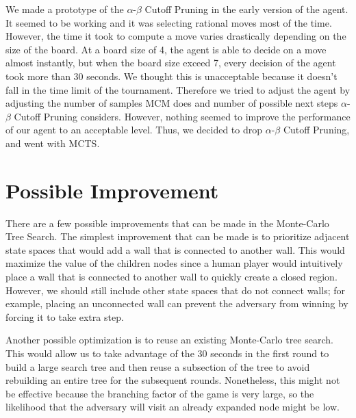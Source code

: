 \documentclass[twoside,11pt]{article}
\begin{document}
We made a prototype of the \(\alpha\)-\(\beta\) Cutoff Pruning in the early version of the agent. 
It seemed to be working and it was selecting rational moves most of the time. 
However, the time it took to compute a move varies drastically depending on the size of the board. 
At a board size of 4, the agent is able to decide on a move almost instantly, but when the board size exceed 7, every decision of the agent took more than 30 seconds.
We thought this is unacceptable because it doesn't fall in the time limit of the tournament.
Therefore we tried to adjust the agent by adjusting the number of samples MCM does and number of possible next steps \(\alpha\)-\(\beta\) Cutoff Pruning considers.
However, nothing seemed to improve the performance of our agent to an acceptable level.
Thus, we decided to drop \(\alpha\)-\(\beta\) Cutoff Pruning, and went with MCTS.

\section{Possible Improvement}

There are a few possible improvements that can be made in the Monte-Carlo Tree Search.
The simplest improvement that can be made is to prioritize adjacent state spaces that would add a wall that is connected to another wall.
This would maximize the value of the children nodes since a human player would intuitively place a wall that is connected to another wall to quickly create a closed region.
However, we should still include other state spaces that do not connect walls;
for example, placing an unconnected wall can prevent the adversary from winning by forcing it to take extra step.

Another possible optimization is to reuse an existing Monte-Carlo tree search.
This would allow us to take advantage of the 30 seconds in the first round to build a large search tree and then reuse a subsection of the tree to avoid rebuilding an entire tree for the subsequent rounds.
Nonetheless, this might not be effective because the branching factor of the game is very large, so the likelihood that the adversary will visit an already expanded node might be low. 

% 
\end{document}
